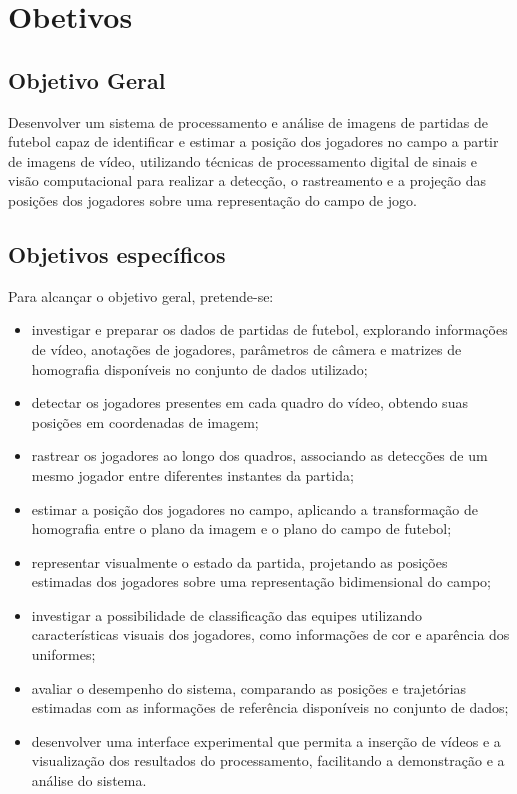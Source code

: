 \section{Obetivos}
\subsection{Objetivo Geral}
Desenvolver um sistema de processamento e análise de imagens de partidas de futebol capaz de identificar 
e estimar a posição dos jogadores no campo a partir de imagens de vídeo, utilizando técnicas de processamento digital 
de sinais e visão computacional para realizar a detecção, o rastreamento e a projeção das posições dos jogadores sobre uma 
representação do campo de jogo.
\subsection{Objetivos específicos} 
Para alcançar o objetivo geral, pretende-se: 
\begin{itemize} 
    \item investigar e preparar os dados de partidas de futebol, explorando informações de vídeo, anotações de jogadores, parâmetros de câmera e matrizes de homografia disponíveis no conjunto de dados utilizado; 
    \item detectar os jogadores presentes em cada quadro do vídeo, obtendo suas posições em coordenadas de imagem; 
    \item rastrear os jogadores ao longo dos quadros, associando as detecções de um mesmo jogador entre diferentes instantes da partida; 
    \item estimar a posição dos jogadores no campo, aplicando a transformação de homografia entre o plano da imagem e o plano do campo de futebol; 
    \item representar visualmente o estado da partida, projetando as posições estimadas dos jogadores sobre uma representação bidimensional do campo; 
    \item investigar a possibilidade de classificação das equipes utilizando características visuais dos jogadores, como informações de cor e aparência dos uniformes; 
    \item avaliar o desempenho do sistema, comparando as posições e trajetórias estimadas com as informações de referência disponíveis no conjunto de dados; 
    \item desenvolver uma interface experimental que permita a inserção de vídeos e a visualização dos resultados do processamento, facilitando a demonstração e a análise do sistema. 
\end{itemize} 

